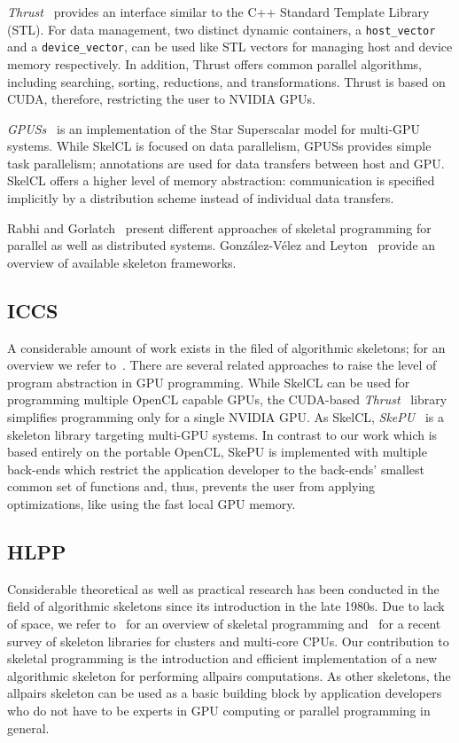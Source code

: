 \emph{Thrust}~\cite{HoB-09a} provides an interface similar to the C++ Standard Template Library (STL).
For data management, two distinct dynamic containers, a \texttt{host\_vector} and a \texttt{device\_vector}, can be used like STL vectors for managing host and device memory respectively.
In addition, Thrust offers common parallel algorithms, including searching, sorting, reductions, and transformations.
Thrust is based on CUDA, therefore, restricting the user to NVIDIA GPUs.

\emph{GPUSs}~\cite{AyBILMQ-09} is an implementation of the Star Superscalar model for multi-GPU systems.
While SkelCL is focused on data parallelism, GPUSs provides simple task parallelism;
annotations are used for data transfers between host and GPU.
SkelCL offers a higher level of memory abstraction: communication is specified implicitly by a distribution scheme instead of individual data transfers.

Rabhi and Gorlatch~\cite{RaG-03} present different approaches of skeletal programming for parallel as well as distributed systems.
Gonz\'{a}lez-V\'{e}lez and Leyton~\cite{GoL-10} provide an overview of available skeleton frameworks.

\subsection{ICCS}
A considerable amount of work exists in the filed of algorithmic skeletons;
for an overview we refer to~\cite{gc11}.
There are several related approaches to raise the level of program abstraction in GPU programming.
While SkelCL can be used for programming multiple OpenCL capable GPUs, the CUDA-based \emph{Thrust}~\cite{HoB-09a} library simplifies programming only for a single NVIDIA GPU.
As SkelCL, \emph{SkePU}~\cite{EnK-10} is a skeleton library targeting multi-GPU systems.
In contrast to our work which is based entirely on the portable OpenCL, SkePU is implemented with multiple back-ends which restrict the application developer to the back-ends' smallest common set of functions and, thus, prevents the user from applying optimizations, like using the fast local GPU memory.

\subsection{HLPP}
Considerable theoretical as well as practical research has been conducted in the field of algorithmic skeletons since its introduction in the late 1980s.
Due to lack of space, we refer to~\cite{GoC-11} for an overview of skeletal programming and~\cite{gl10} for a recent survey of skeleton libraries for clusters and multi-core CPUs.
Our contribution to skeletal programming is the introduction and efficient implementation of a new algorithmic skeleton for performing allpairs computations.
As other skeletons, the allpairs skeleton can be used as a basic building block by application developers who do not have to be experts in GPU computing or parallel programming in general.

